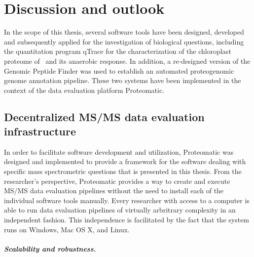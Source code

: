 \cleardoublepage
\chapter{Discussion and outlook}

In the scope of this thesis, several software tools have been designed, 
developed and subsequently applied for the investigation of biological 
questions, including the quantitation program qTrace for the characterization 
of the chloroplast proteome of \cre~and its anaerobic response.
In addition, a re-designed version of the Genomic Peptide Finder was used
to establish an automated proteogenomic genome annotation pipeline.
These two systems have been implemented in the context of the data evaluation
platform Proteomatic.

\section{Decentralized MS/MS data evaluation infrastructure}

In order to facilitate software development and utilization, Proteomatic
was designed and implemented to provide a framework for the software
dealing with specific mass spectrometric questions that is presented in 
this thesis.
From the researcher's perspective, Proteomatic provides a way to create and
execute MS/MS data evaluation pipelines without the need to install each of
the individual software tools manually.
Every researcher with access to a computer is able to run data evaluation
pipelines of virtually arbritrary complexity in an independent fashion.
This independence is facilitated by the fact that the system runs on Windows,
Mac OS X, and Linux.

\paragraph{Scalability and robustness.}

